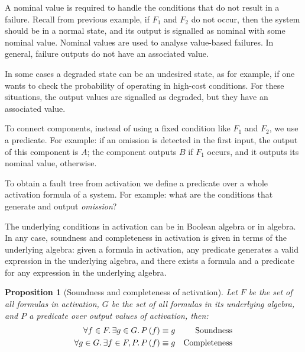 \documentclass[12pt,openright,twoside,a4paper,oldfontcommands,english,brazil,final]{abntex2}
\theoremstyle{theo}
\newtheorem{proposition}{Proposition}[chapter]
\newcommand{\parsin}[1]{\ensuremath\left( #1 \right)}
\begin{document}
A nominal value is required to handle the conditions that do not result in a failure.
Recall from previous example, if $F_1$ and $F_2$ do not occur, then the system should be in a normal state, and its output is signalled as nominal with some nominal value.
Nominal values are used to analyse value-based failures.
In general, failure outputs do not have an associated value.

In some cases a degraded state can be an undesired state, as for example, if one wants to check the probability of operating in high-cost conditions.
For these situations, the output values are signalled as degraded, but they have an associated value.

To connect components, instead of using a fixed condition like $F_1$ and $F_2$, we use a predicate.
For example: if an omission is detected in the first input, the output of this component is $A$; the component outputs $B$ if $F_1$ occurs, and it outputs its nominal value, otherwise.

To obtain a fault tree from \ac{activation} we define a predicate over a whole \ac{activation} formula of a system.
For example: what are the conditions that generate and output \emph{omission}?

The underlying conditions in \ac{activation} can be in Boolean algebra or in \ac{algebra}.
In any case, soundness and completeness in \ac{activation} is given in terms of the underlying algebra: given a formula in \ac{activation}, any predicate generates a valid expression in the underlying algebra, and there exists a formula and a predicate for any expression in the underlying algebra.

\begin{proposition}[Soundness and completeness of \ac{activation}]
Let $F$ be the set of all formulas in \ac{activation}, $G$ be the set of all formulas in its underlying algebra, and $P$ a predicate over output values of \ac{activation}, then:
%
\begin{subequations}
  \begin{align}
    \forall f \in F \ldotp \exists g \in G \ldotp P\parsin{f} & \equiv g & \text{Soundness} \\
    \forall g \in G \ldotp \exists f \in F, P \ldotp P\parsin{f} & \equiv g & \text{Completeness}
  \end{align}
\end{subequations}
\end{proposition}
\end{document}
